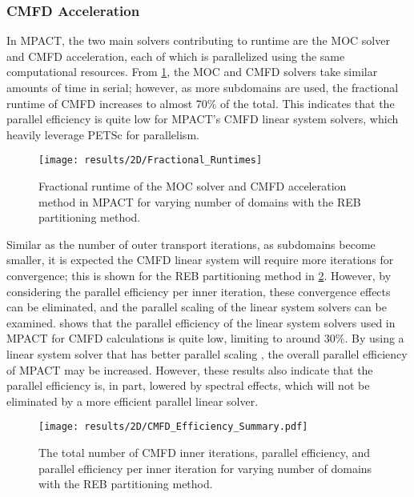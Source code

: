 {{{      \subsubsection{CMFD Acceleration}{\label{sssec:CMFD Acceleration}
        In MPACT, the two main solvers contributing to runtime are the \ac{MOC} solver and \ac{CMFD} acceleration, each of which is parallelized using the same computational resources.
        From \cref{fig:Spatial Decomposition:Fractional Runtimes}, the \ac{MOC} and \ac{CMFD} solvers take similar amounts of time in serial; however, as more subdomains are used, the fractional runtime of \ac{CMFD} increases to almost 70\% of the total.
        This indicates that the parallel efficiency is quite low for MPACT's \ac{CMFD} linear system solvers, which heavily leverage PETSc \cite{Petsc} for parallelism.

        \begin{figure}
          \centering
          \texttt{[image: results/2D/Fractional\_Runtimes]}
          \caption{Fractional runtime of the \ac{MOC} solver and \ac{CMFD} acceleration method in MPACT for varying number of domains with the \ac{REB} partitioning method. \label{fig:Spatial Decomposition:Fractional Runtimes}}
        \end{figure}

        Similar as the number of outer transport iterations, as subdomains become smaller, it is expected the \ac{CMFD} linear system will require more iterations for convergence; this is shown for the \ac{REB} partitioning method in \cref{fig:Spatial Decomposition:CMFD Efficiency Summary}.
        However, by considering the parallel efficiency per inner iteration, these convergence effects can be eliminated, and the parallel scaling of the linear system solvers can be examined.
         shows that the parallel efficiency of the linear system solvers used in MPACT for \ac{CMFD} calculations is quite low, limiting to around 30\%.
        By using a linear system solver that has better parallel scaling \cite{Hao2018}, the overall parallel efficiency of MPACT may be increased.
        However, these results also indicate that the parallel efficiency is, in part, lowered by spectral effects, which will not be eliminated by a more efficient parallel linear solver.

        \begin{figure}
          \centering
          \texttt{[image: results/2D/CMFD\_Efficiency\_Summary.pdf]}
          \caption{The total number of \ac{CMFD} inner iterations, parallel efficiency, and parallel efficiency per inner iteration for varying number of domains with the \ac{REB} partitioning method. \label{fig:Spatial Decomposition:CMFD Efficiency Summary}}
        \end{figure}
      }
    }
}}
